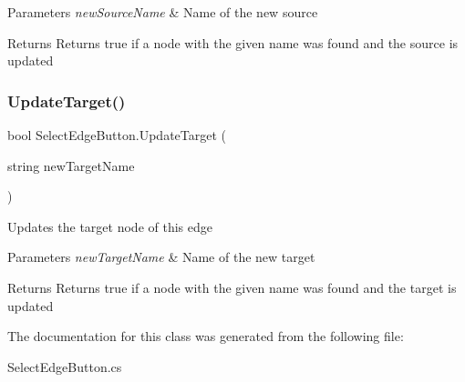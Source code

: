 \begin{DoxyParams}{Parameters}
{\em new\+Source\+Name} & Name of the new source\\
\hline
\end{DoxyParams}
\begin{DoxyReturn}{Returns}
Returns true if a node with the given name was found and the source is updated
\end{DoxyReturn}
\mbox{\label{class_select_edge_button_a3a394258288e816eb5c06e6608edad4a}} 
\subsubsection{\texorpdfstring{Update\+Target()}{UpdateTarget()}}
{\footnotesize\ttfamily bool Select\+Edge\+Button.\+Update\+Target (\begin{DoxyParamCaption}\item[{string}]{new\+Target\+Name }\end{DoxyParamCaption})}



Updates the target node of this edge 


\begin{DoxyParams}{Parameters}
{\em new\+Target\+Name} & Name of the new target\\
\hline
\end{DoxyParams}
\begin{DoxyReturn}{Returns}
Returns true if a node with the given name was found and the target is updated
\end{DoxyReturn}


The documentation for this class was generated from the following file\+:\begin{DoxyCompactItemize}
\item 
Select\+Edge\+Button.\+cs\end{DoxyCompactItemize}
